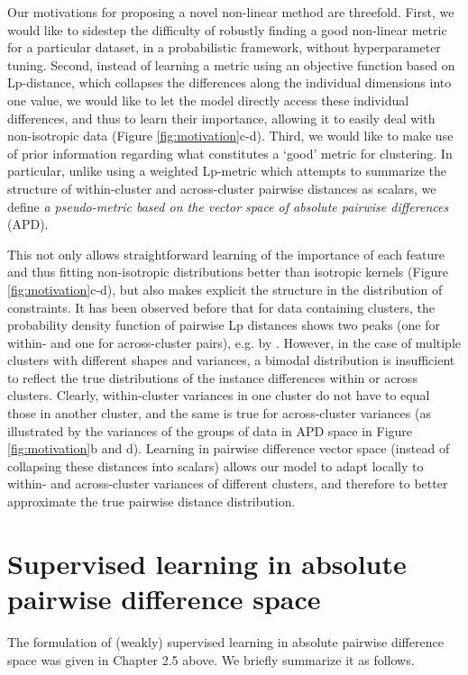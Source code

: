 \documentclass[12pt,PhD,twoside]{muthesis}
\begin{document}
Our motivations for proposing a novel non-linear method are threefold. First, we would like to sidestep the difficulty of robustly finding a good non-linear metric for a particular dataset, in a probabilistic framework, without hyperparameter tuning. Second, instead of learning a metric using an objective function based on Lp-distance, which collapses the differences along the individual dimensions into one value, we would like to let the model directly access these individual differences, and thus to learn their importance, allowing it to easily deal with non-isotropic data (Figure \ref{fig:motivation}c-d). Third, we would like to make use of prior information regarding what constitutes a `good' metric for clustering. In particular, unlike using a weighted Lp-metric which attempts to summarize the structure of within-cluster and across-cluster pairwise distances as scalars, we define \textit{a pseudo-metric based on the vector space of absolute pairwise differences} (APD). 

This not only allows straightforward learning of the importance of each feature and thus fitting non-isotropic distributions better than isotropic kernels (Figure \ref{fig:motivation}c-d), but also makes explicit the structure in the distribution of constraints. It has been observed before that for data containing clusters, the probability density function of pairwise Lp distances shows two peaks (one for within- and one for across-cluster pairs), e.g. by \citep{brin1995near}. However, in the case of multiple clusters with different shapes and variances, a bimodal distribution is insufficient to reflect the true distributions of the instance differences within or across clusters. Clearly, within-cluster variances in one cluster do not have to equal those in another cluster, and the same is true for across-cluster variances (as illustrated by the variances of the groups of data in APD space in Figure \ref{fig:motivation}b and d). Learning in pairwise difference vector space (instead of collapsing these distances into scalars) allows our model to adapt locally to within- and across-cluster variances of different clusters, and therefore to better approximate the true pairwise distance distribution. 

\section*{Supervised learning in absolute pairwise difference space}

The formulation of (weakly) supervised learning in absolute pairwise difference space was given in Chapter 2.5 above. We briefly summarize it as follows.
\end{document}
